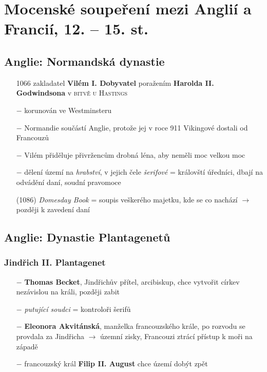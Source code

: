 \documentclass{article}
\begin{document}
\section*{Mocenské soupeření mezi Anglií a Francií, 12. -- 15. st.}
\subsection*{Anglie: Normandská dynastie}
\begin{itemize}
    \vspace{-0.5em}
    \setlength\itemsep{0.15em}
    \item[1066] zakladatel \textbf{Vilém I. Dobyvatel} poražením \textbf{Harolda II. Godwindsona} v \textsc{bitvě u Hastings}
    \item[$-$] korunován ve Westminsteru
    \item[$-$] Normandie součástí Anglie, protože jej v roce 911 Vikingové dostali od Francouzů
    \item[$-$] Vilém přiděluje přivržencům drobná léna, aby neměli moc velkou moc
    \item[$-$] dělení území na \textit{hrabství}, v jejich čele \textit{šerifové} = královští úředníci, dbají na odvádění daní, soudní pravomoce
    \item[(1086)] \textit{Domesday Book} = soupis veškerého majetku, kde se co nachází $\rightarrow$ později k zavedení daní
\end{itemize}


\subsection*{Anglie: Dynastie Plantagenetů}
\subsubsection*{Jindřich II. Plantagenet}
\begin{itemize}
    \vspace{-0.5em}
    \setlength\itemsep{0.15em}
    \item[$-$] \textbf{Thomas Becket}, Jindřichův přítel, arcibiskup, chce vytvořit církev nezávislou na králi, později zabit
    \item[$-$] \textit{putující soudci} = kontroloři šerifů
    \item[$-$] \textbf{Eleonora Akvitánská}, manželka francouzského krále, po rozvodu se provdala za Jindřicha $\rightarrow$ územní zisky, Francouzi ztrácí přístup k moři na západě
    \item[$-$] francouzský král \textbf{Filip II. August} chce území dobýt zpět
\end{itemize}
\end{document}
